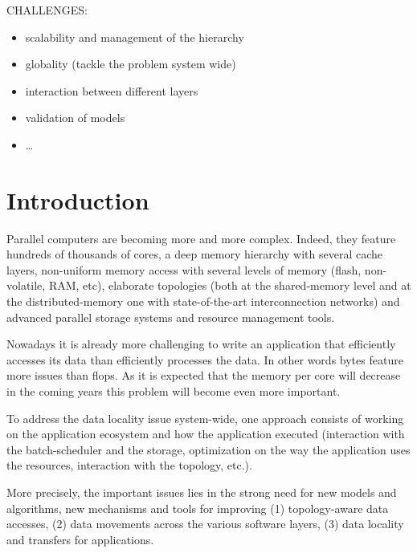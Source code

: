 CHALLENGES:
\begin{itemize}
\item scalability and management of the hierarchy
\item globality (tackle the problem system wide)
\item interaction between different layers
\item validation of models
\item \ldots
\end{itemize}


\section{Introduction}
 

Parallel computers are becoming more and more complex. 
Indeed, they feature hundreds of thousands of cores, a deep memory hierarchy with 
several cache layers, non-uniform memory access with  several levels of memory (flash,
non-volatile, RAM, etc), elaborate topologies (both at the
shared-memory level and at the distributed-memory one with state-of-the-art
interconnection networks) and advanced parallel storage systems and resource
management tools.

Nowadays it is already more challenging to write an application that efficiently
accesses its data than efficiently processes the data. In other words bytes 
feature more issues than flops. As it is expected that the memory
per core will decrease in the coming years this problem will become even
more important. 

To address the data locality issue system-wide, one approach consists of
working on the application ecosystem and how the application executed (interaction
with the batch-scheduler and the storage, optimization on the way the
application uses the resources, interaction with the topology, etc.). 

More precisely, the important issues lies in the strong need for new models and algorithms, new 
mechanisms and tools for improving (1) topology-aware data accesses, (2) data 
movements across the various software layers, (3) data locality and transfers for 
applications. 
